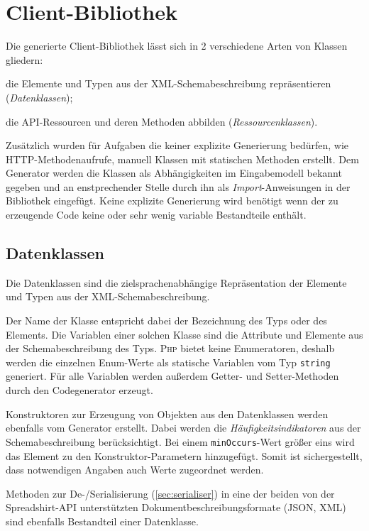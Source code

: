 \section{Client-Bibliothek}
\label{sec:client_library}

Die generierte Client-Bibliothek lässt sich in 2 verschiedene Arten von Klassen gliedern:
\begin{compactenum}
    \item die Elemente und Typen aus der \gls{XML}-Schemabeschreibung repräsentieren (\emph{Datenklassen});
    \item die \gls{API}-Ressourcen und deren Methoden abbilden (\emph{Ressourcenklassen}).
\end{compactenum}

Zusätzlich wurden für Aufgaben die keiner explizite Generierung bedürfen, wie \gls{HTTP}-Methodenaufrufe, manuell Klassen mit statischen Methoden erstellt. Dem Generator werden die Klassen als Abhängigkeiten im Eingabemodell bekannt gegeben und an enstprechender Stelle durch ihn als \emph{Import}-Anweisungen in der Bibliothek eingefügt. Keine explizite Generierung wird benötigt wenn der zu erzeugende Code keine oder sehr wenig variable Bestandteile enthält.

\subsection{Datenklassen}
\label{sec:dataclasses}

Die Datenklassen sind die zielsprachenabhängige Repräsentation der Elemente und Typen aus der \gls{XML}-Schemabeschreibung. 

Der Name der Klasse entspricht dabei der Bezeichnung des Typs oder des Elements. Die Variablen einer solchen Klasse sind die Attribute und Elemente aus der Schemabeschreibung des Typs. \textsc{Php} bietet keine Enumeratoren, deshalb werden die einzelnen Enum-Werte als statische Variablen vom Typ \texttt{string} generiert. Für alle Variablen werden außerdem Getter- und Setter-Methoden durch den Codegenerator erzeugt.

Konstruktoren zur Erzeugung von Objekten aus den Datenklassen werden ebenfalls vom Generator erstellt. Dabei werden die \emph{Häufigkeitsindikatoren} aus der Schemabeschreibung berücksichtigt. Bei einem \texttt{minOccurs}-Wert größer eins wird das Element zu den Konstruktor-Parametern hinzugefügt. Somit ist sichergestellt, dass notwendigen Angaben auch Werte zugeordnet werden.

Methoden zur De-/Serialisierung (\cref{sec:serialiser}) in eine der beiden von der Spreadshirt-\gls{API} unterstützten Dokumentbeschreibungsformate (\gls{JSON}, \gls{XML}) sind ebenfalls Bestandteil einer Datenklasse.

